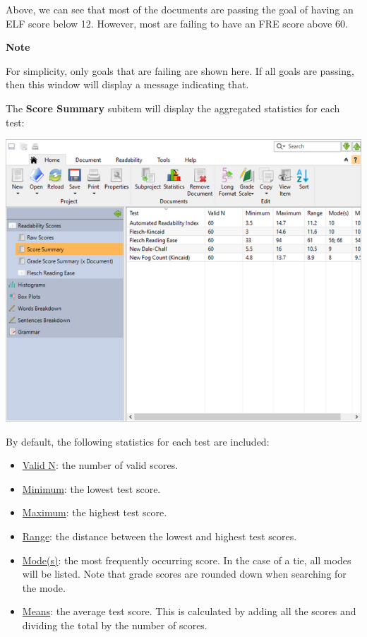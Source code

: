 \documentclass[
]{book}
\providecommand{\tightlist}{%
  \setlength{\itemsep}{0pt}\setlength{\parskip}{0pt}}
\newenvironment{notesection}
    {
    \begin{tcolorbox}[colframe=mediumblue,colback=lightblue,coltext=mediumblue,arc=3mm]
    \faLightbulb[regular] \textbf{Note} \newline
    }
    {
    \end{tcolorbox}
    }
\theoremstyle{definition}
\theoremstyle{definition}
\theoremstyle{definition}
\theoremstyle{definition}
\theoremstyle{remark}
\begin{document}
Above, we can see that most of the documents are passing the goal of having an ELF score below 12. However, most are failing to have an FRE score above 60.

\begin{notesection}
For simplicity, only goals that are failing are shown here. If all goals are passing, then this window will display a message indicating that.

\end{notesection}

The \textbf{Score Summary} subitem will display the aggregated statistics for each test:

\includegraphics{Images/batchscorestats.png}

By default, the following statistics for each test are included:

\begin{itemize}
\tightlist
\item
  \protect\hyperlink{stat-terms}{Valid N}: the number of valid scores.
\item
  \protect\hyperlink{stat-terms}{Minimum}: the lowest test score.
\item
  \protect\hyperlink{stat-terms}{Maximum}: the highest test score.
\item
  \protect\hyperlink{stat-terms}{Range}: the distance between the lowest and highest test scores.
\item
  \protect\hyperlink{stat-terms}{Mode(s)}: the most frequently occurring score. In the case of a tie, all modes will be listed. Note that grade scores are rounded down when searching for the mode.
\item
  \protect\hyperlink{stat-terms}{Means}: the average test score. This is calculated by adding all the scores and dividing the total by the number of scores.
\end{itemize}
\end{document}

